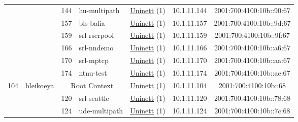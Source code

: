 \begin{small}
\begin{center}
\begin{longtable}{|c|c|c|c|c|c|c|c|}
  &  & \tiny{144} & \multicolumn{1}{|l|}{\tiny{hu-multipath}} & \multicolumn{2}{|c|}{\tiny{\href{https://www.uninett.no}{Uninett} (1)}} & \tiny{10.1.11.144} & \tiny{2001:700:4100:10b::90:67} \\* \cline{3-3}\cline{4-4}\cline{5-5}\cline{6-6}\cline{7-7}\cline{8-8}
  &  & \tiny{157} & \multicolumn{1}{|l|}{\tiny{bls-balia}} & \multicolumn{2}{|c|}{\tiny{\href{https://www.uninett.no}{Uninett} (1)}} & \tiny{10.1.11.157} & \tiny{2001:700:4100:10b::9d:67} \\* \cline{3-3}\cline{4-4}\cline{5-5}\cline{6-6}\cline{7-7}\cline{8-8}
  &  & \tiny{159} & \multicolumn{1}{|l|}{\tiny{srl-rserpool}} & \multicolumn{2}{|c|}{\tiny{\href{https://www.uninett.no}{Uninett} (1)}} & \tiny{10.1.11.159} & \tiny{2001:700:4100:10b::9f:67} \\* \cline{3-3}\cline{4-4}\cline{5-5}\cline{6-6}\cline{7-7}\cline{8-8}
  &  & \tiny{166} & \multicolumn{1}{|l|}{\tiny{srl-nndemo}} & \multicolumn{2}{|c|}{\tiny{\href{https://www.uninett.no}{Uninett} (1)}} & \tiny{10.1.11.166} & \tiny{2001:700:4100:10b::a6:67} \\* \cline{3-3}\cline{4-4}\cline{5-5}\cline{6-6}\cline{7-7}\cline{8-8}
  &  & \tiny{170} & \multicolumn{1}{|l|}{\tiny{srl-mptcp}} & \multicolumn{2}{|c|}{\tiny{\href{https://www.uninett.no}{Uninett} (1)}} & \tiny{10.1.11.170} & \tiny{2001:700:4100:10b::aa:67} \\* \cline{3-3}\cline{4-4}\cline{5-5}\cline{6-6}\cline{7-7}\cline{8-8}
  &  & \tiny{174} & \multicolumn{1}{|l|}{\tiny{ntnu-test}} & \multicolumn{2}{|c|}{\tiny{\href{https://www.uninett.no}{Uninett} (1)}} & \tiny{10.1.11.174} & \tiny{2001:700:4100:10b::ae:67} \\ \hline
 \multirow{8}{*}{\tiny{104}} & \multicolumn{1}{|l|}{\multirow{8}{*}{\tiny{bleikoeya}}} & \multicolumn{2}{|c|}{\tiny{Root Context}} & \multicolumn{2}{|c|}{\tiny{\href{https://www.uninett.no}{Uninett} (1)}} & \tiny{10.1.11.104} & \tiny{2001:700:4100:10b::68} \\* \cline{3-3}\cline{4-4}\cline{5-5}\cline{6-6}\cline{7-7}\cline{8-8}
  &  & \tiny{120} & \multicolumn{1}{|l|}{\tiny{srl-seattle}} & \multicolumn{2}{|c|}{\tiny{\href{https://www.uninett.no}{Uninett} (1)}} & \tiny{10.1.11.120} & \tiny{2001:700:4100:10b::78:68} \\* \cline{3-3}\cline{4-4}\cline{5-5}\cline{6-6}\cline{7-7}\cline{8-8}
  &  & \tiny{124} & \multicolumn{1}{|l|}{\tiny{ude-multipath}} & \multicolumn{2}{|c|}{\tiny{\href{https://www.uninett.no}{Uninett} (1)}} & \tiny{10.1.11.124} & \tiny{2001:700:4100:10b::7c:68} \\* \cline{3-3}\cline{4-4}\cline{5-5}\cline{6-6}\cline{7-7}\cline{8-8}

\end{longtable}
\end{center}
\end{small}
